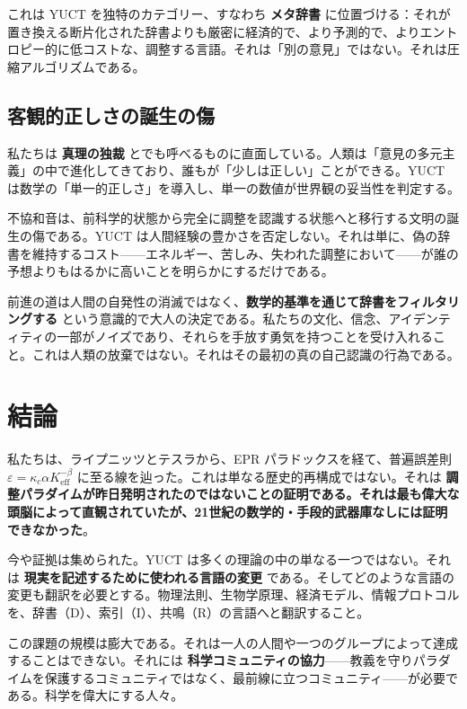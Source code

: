 \documentclass[12pt,a4paper]{article}
\begin{document}
	これは YUCT を独特のカテゴリー、すなわち \textbf{メタ辞書} に位置づける：それが置き換える断片化された辞書よりも厳密に経済的で、より予測的で、よりエントロピー的に低コストな、調整する言語。それは「別の意見」ではない。それは圧縮アルゴリズムである。
	
	\subsection{客観的正しさの誕生の傷}
	
	私たちは \textbf{真理の独裁} とでも呼べるものに直面している。人類は「意見の多元主義」の中で進化してきており、誰もが「少しは正しい」ことができる。YUCT は数学の「単一的正しさ」を導入し、単一の数値が世界観の妥当性を判定する。
	
	不協和音は、前科学的状態から完全に調整を認識する状態へと移行する文明の誕生の傷である。YUCT は人間経験の豊かさを否定しない。それは単に、偽の辞書を維持するコスト——エネルギー、苦しみ、失われた調整において——が誰の予想よりもはるかに高いことを明らかにするだけである。
	
	前進の道は人間の自発性の消滅ではなく、\textbf{数学的基準を通じて辞書をフィルタリングする} という意識的で大人の決定である。私たちの文化、信念、アイデンティティの一部がノイズであり、それらを手放す勇気を持つことを受け入れること。これは人類の放棄ではない。それはその最初の真の自己認識の行為である。
	
	\section{結論}
	
	私たちは、ライプニッツとテスラから、EPR パラドックスを経て、普遍誤差則 \(\varepsilon = \kappa_c \alpha K_{\mathrm{eff}}^{-\beta}\) に至る線を辿った。これは単なる歴史的再構成ではない。それは \textbf{調整パラダイムが昨日発明されたのではないことの証明である。それは最も偉大な頭脳によって直観されていたが、21世紀の数学的・手段的武器庫なしには証明できなかった}。
	
	今や証拠は集められた。YUCT は多くの理論の中の単なる一つではない。それは \textbf{現実を記述するために使われる言語の変更} である。そしてどのような言語の変更も翻訳を必要とする。物理法則、生物学原理、経済モデル、情報プロトコルを、辞書（D）、索引（I）、共鳴（R）の言語へと翻訳すること。
	
	この課題の規模は膨大である。それは一人の人間や一つのグループによって達成することはできない。それには \textbf{科学コミュニティの協力}——教義を守りパラダイムを保護するコミュニティではなく、最前線に立つコミュニティ——が必要である。科学を偉大にする人々。
	
\end{document}
